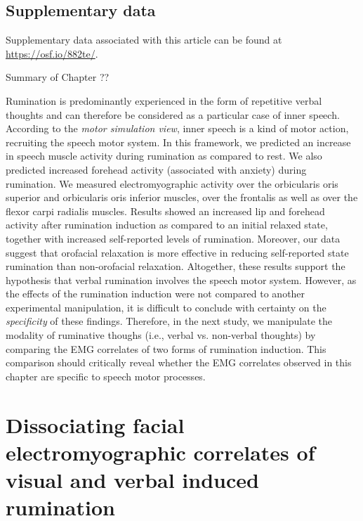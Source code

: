 \documentclass[a4paper,12pt,twoside,onecolumn,openright,final,oldfontcommands]{memoir}
\newcommand\getcurrentref[1]{
 \ifnumequal{\value{#1}}{0}
  {??}
  {\the\value{#1}}
}
\begin{document}
\hypertarget{suppCH3}{%
\section{Supplementary data}\label{suppCH3}}

Supplementary data associated with this article can be found at \url{https://osf.io/882te/}.

\newpage

\begin{vplace}[1]

\begin{summary}{Summary of Chapter\getcurrentref{chapter}}

Rumination is predominantly experienced in the form of repetitive verbal thoughts and can therefore be considered as a particular case of inner speech. According to the \textit{motor simulation view}, inner speech is a kind of motor action, recruiting the speech motor system. In this framework, we predicted an increase in speech muscle activity during rumination as compared to rest. We also predicted increased forehead activity (associated with anxiety) during rumination. We measured electromyographic activity over the orbicularis oris superior and orbicularis oris inferior muscles, over the frontalis as well as over the flexor carpi radialis muscles. Results showed an increased lip and forehead activity after rumination induction as compared to an initial relaxed state, together with increased self-reported levels of rumination. Moreover, our data suggest that orofacial relaxation is more effective in reducing self-reported state rumination than non-orofacial relaxation. Altogether, these results support the hypothesis that verbal rumination involves the speech motor system. However, as the effects of the rumination induction were not compared to another experimental manipulation, it is difficult to conclude with certainty on the \textit{specificity} of these findings. Therefore, in the next study, we manipulate the modality of ruminative thoughs (i.e., verbal vs. non-verbal thoughts) by comparing the EMG correlates of two forms of rumination induction. This comparison should critically reveal whether the EMG correlates observed in this chapter are specific to speech motor processes.

\end{summary}

\end{vplace}

\hypertarget{chap4}{%
\chapter{Dissociating facial electromyographic correlates of visual and verbal induced rumination}\label{chap4}}
\end{document}
